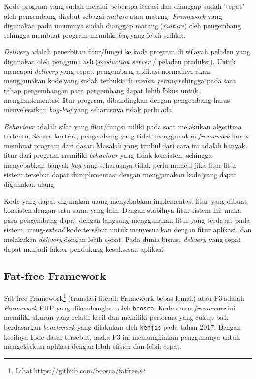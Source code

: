     Kode program yang sudah melalui beberapa iterasi dan dianggap sudah "tepat"
    oleh pengembang disebut sebagai \textit{mature} atau matang.
    \textit{Framework} yang digunakan pada umumnya sudah dianggap matang
    (\textit{mature}) oleh pengembang sehingga membuat program memiliki
    \textit{bug} yang lebih sedikit.
    
    \textit{Delivery} adalah penerbitan fitur/fungsi ke kode program di wilayah
    peladen yang digunakan oleh pengguna asli (\textit{production server} / 
    peladen produksi). Untuk mencapai \textit{delivery} yang cepat, 
    pengembang aplikasi normalnya akan
    menggunakan kode yang sudah terbukti di \textit{medan perang} sehingga pada 
    saat tahap pengembangan para pengembang dapat lebih fokus untuk mengimplementasi
    fitur program, dibandingkan dengan pengembang harus menyelesaikan
    \textit{bug-bug} yang seharusnya tidak perlu ada.
    
    \textit{Behaviour} adalah sifat yang fitur/fungsi miliki pada saat melakukan
    algoritma tertentu. Secara kontras, pengembang yang tidak menggunakan
    \textit{framework} harus membuat program dari dasar. Masalah yang timbul
    dari cara ini adalah banyak fitur dari program memiliki \textit{behaviour}
    yang tidak konsisten, sehingga menyebabkan banyak \textit{bug} yang
    seharusnya tidak perlu muncul jika fitur-fitur sistem tersebut dapat
    diimplementasi dengan menggunakan kode yang dapat digunakan-ulang.
    
    Kode yang dapat digunakan-ulang menyebabkan implementasi fitur yang dibuat
    konsisten dengan satu sama yang lain. Dengan stabilnya fitur sistem ini,
    maka para pengembang dapat dengan langsung menggunakan fitur yang terdapat
    pada sistem, meng-\textit{extend} kode tersebut untuk menyesuaikan dengan
    fitur aplikasi, dan melakukan \textit{delivery} dengan lebih cepat. Pada
    dunia bisnis, \textit{delivery} yang cepat dapat menjadi faktor pendukung
    kesuksesan aplikasi.

\subsection{Fat-free Framework}
    Fat-free Framework\footnote{Lihat
    https://github.com/bcosca/fatfree.} (translasi literal:
    Framework bebas lemak) atau F3 adalah \textit{Framework} PHP yang
    dikembangkan oleh \texttt{bcosca}. Kode dasar \textit{framework} ini
    memiliki ukuran yang relatif kecil dan memiliki performa yang cukup baik
    berdasarkan \textit{benchmark} yang dilakukan oleh \texttt{kenjis} pada
    tahun 2017\cite{kenjis:framework-benchmark}. Dengan kecilnya kode dasar
    tersebut, maka F3 ini memungkinkan penggunanya untuk mengeksekusi aplikasi
    dengan lebih efisien dan lebih cepat.
    
